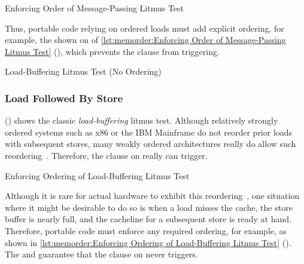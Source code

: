 \begin{listing}

\caption{Enforcing Order of Message-Passing Litmus Test}
\label{lst:memorder:Enforcing Order of Message-Passing Litmus Test}
\end{listing}

\begin{fcvref}
Thus, portable code relying on ordered loads must
add explicit ordering, for example, the  shown on
 of
\cref{lst:memorder:Enforcing Order of Message-Passing Litmus Test}
(), which prevents
the  clause from triggering.
\end{fcvref}

\begin{listing}

\caption{Load-Buffering Litmus Test (No Ordering)}
\label{lst:memorder:Load-Buffering Litmus Test (No Ordering)}
\end{listing}

\subsubsection{Load Followed By Store}
\label{sec:memorder:Load Followed By Store}

\begin{fcvref}
()
shows the classic \emph{load-buffering} litmus test.
Although relatively strongly ordered systems such as x86
or the IBM Mainframe do not reorder prior loads with subsequent stores,
many weakly ordered architectures really do allow such
reordering~\cite{JadeAlglave2011ppcmem}.
Therefore, the  clause on  really can trigger.
\end{fcvref}

\begin{listing}

\caption{Enforcing Ordering of Load-Buffering Litmus Test}
\label{lst:memorder:Enforcing Ordering of Load-Buffering Litmus Test}
\end{listing}

\begin{fcvref}
Although it is rare for actual hardware to
exhibit this reordering~\cite{LucMaranget2017aarch64},
one situation where it might be desirable to do so is when a load
misses the cache, the store buffer is nearly full, and the cacheline for
a subsequent store is ready at hand.
Therefore, portable code must enforce any required ordering, for example,
as shown in
\cref{lst:memorder:Enforcing Ordering of Load-Buffering Litmus Test}
().
The  and  guarantee that
the  clause on  never triggers.
\end{fcvref}

